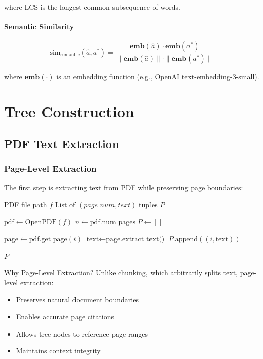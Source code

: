 \documentclass[12pt,a4paper]{article}
\begin{document}
where LCS is the longest common subsequence of words.

\paragraph{Semantic Similarity}
\begin{equation}
\text{sim}_{\text{semantic}}(\hat{a}, a^*) = \frac{\mathbf{emb}(\hat{a}) \cdot \mathbf{emb}(a^*)}{\|\mathbf{emb}(\hat{a})\| \cdot \|\mathbf{emb}(a^*)\|}
\end{equation}

where $\mathbf{emb}(\cdot)$ is an embedding function (e.g., OpenAI text-embedding-3-small).

\section{Tree Construction}

\subsection{PDF Text Extraction}

\subsubsection{Page-Level Extraction}

The first step is extracting text from PDF while preserving page boundaries:

\begin{algorithm}[H]
\caption{Extract PDF Pages}
\begin{algorithmic}[1]
\Require PDF file path $f$
\Ensure List of $(page\_num, text)$ tuples $P$

\State $\text{pdf} \gets \text{OpenPDF}(f)$
\State $n \gets \text{pdf.num\_pages}$
\State $P \gets []$

    \State $\text{page} \gets \text{pdf.get\_page}(i)$
    \State $\text{text} \gets \text{page.extract\_text()}$
    \State $P.\text{append}((i, \text{text}))$
\EndFor

\State \Return $P$
\end{algorithmic}
\end{algorithm}

\begin{conceptbox}{Why Page-Level Extraction?}
Unlike chunking, which arbitrarily splits text, page-level extraction:
\begin{itemize}
    \item Preserves natural document boundaries
    \item Enables accurate page citations
    \item Allows tree nodes to reference page ranges
    \item Maintains context integrity
\end{itemize}
\end{conceptbox}
\end{document}
